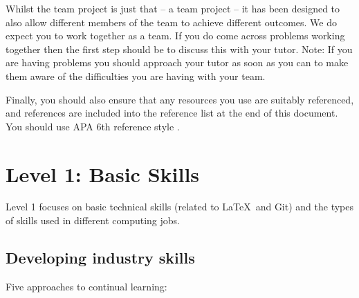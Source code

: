 \documentclass[a4paper, 11pt]{report}
\begin{document}
	Whilst the team project is just that -- a team project -- it has been designed to also allow different members of the team to achieve different outcomes. We do expect you to work together as a team. If you do come across problems working together then the first step should be to discuss this with your tutor. Note: If you are having problems you should approach your tutor as soon as you can to make them aware of the difficulties you are having with your team.
	
	Finally, you should also ensure that any resources you use are suitably referenced, and references are included into the reference list at the end of this document. You should use APA 6th reference style \cite{apa6}.
	
	
	\newpage
	\section{Level 1: Basic Skills}
	
	Level 1 focuses on basic technical skills (related to \LaTeX\ and Git) and the types of skills used in different computing jobs.
	
	\subsection{Developing industry skills}
	
	Five approaches to continual learning:
	
\end{document}
